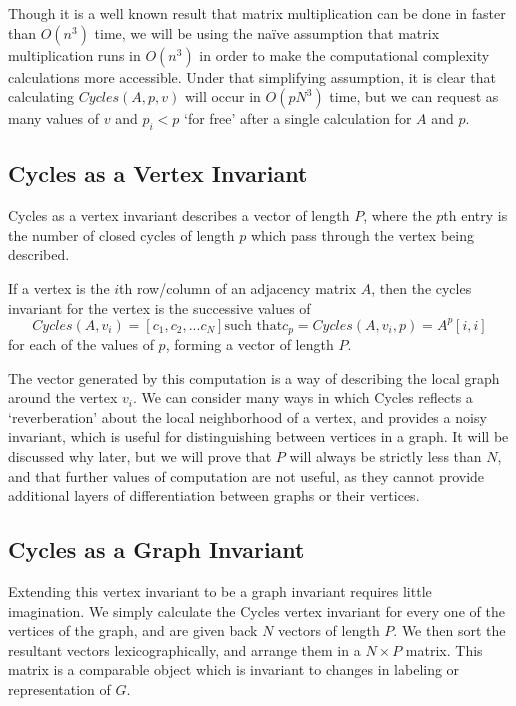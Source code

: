 Though it is a well known result that matrix multiplication can be done in faster than $O(n^3)$ time, we will be using the na\"{i}ve assumption that matrix multiplication runs in $O(n^3)$ in order to make the computational complexity calculations more accessible.  
Under that simplifying assumption, it is clear that calculating $Cycles(A, p, v)$ will occur in $O(p N^3)$ time, but we can request as many values of $v$ and $p_i < p$ `for free' after a single calculation for $A$ and $p$.


\subsection{Cycles as a Vertex Invariant}

Cycles as a vertex invariant describes a vector of length $P$, where the $p$th entry is the number of closed cycles of length $p$ which pass through the vertex being described.

If a vertex is the $i$th row/column of an adjacency matrix $A$, then the cycles invariant for the vertex is the successive values of 
$$Cycles(A, v_i) = [c_1, c_2, ... c_N] \text{such that} c_p = Cycles(A, v_i, p) = A^p[i,i]$$
for each of the values of $p$, forming a vector of length $P$.

The vector generated by this computation is a way of describing the local graph around the vertex $v_i$.
We can consider many ways in which Cycles reflects a `reverberation' about the local neighborhood of a vertex, and provides a noisy invariant, which is useful for distinguishing between vertices in a graph. 
It will be discussed why later, but we will prove that $P$ will always be strictly less than $N$, and that further values of computation are not useful, as they cannot provide additional layers of differentiation between graphs or their vertices.


\subsection{Cycles as a Graph Invariant}

Extending this vertex invariant to be a graph invariant requires little imagination. 
We simply calculate the Cycles vertex invariant for every one of the vertices of the graph, and are given back $N$ vectors of length $P$.
We then sort the resultant vectors lexicographically, and arrange them in a $N \times P$ matrix.
This matrix is a comparable object which is invariant to changes in labeling or representation of $G$.

